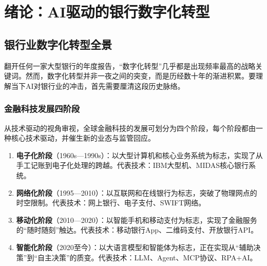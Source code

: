 
\chapter{绪论：AI驱动的银行数字化转型}



\section{银行业数字化转型全景}

翻开任何一家大型银行的年度报告，``数字化转型''几乎都是出现频率最高的战略关键词。然而，数字化转型并非一夜之间的突变，而是历经数十年的渐进积累。要理解当下AI对银行业的冲击，首先需要厘清这段历史脉络。

\subsection{金融科技发展四阶段}

从技术驱动的视角审视，全球金融科技的发展可划分为四个阶段，每个阶段都由一种核心技术驱动，并催生新的业态与监管回应。

\begin{theorybox}[金融科技四阶段模型]
\begin{enumerate}[leftmargin=1.5em]
  \item \textbf{电子化阶段}（1960s—1990s）：以大型计算机和核心业务系统为标志，实现了从手工记账到电子化处理的跨越。代表技术：IBM大型机、MIDAS核心银行系统。
  \item \textbf{网络化阶段}（1995—2010）：以互联网和在线银行为标志，突破了物理网点的时空限制。代表技术：网上银行、电子支付、SWIFT网络。
  \item \textbf{移动化阶段}（2010—2020）：以智能手机和移动支付为标志，实现了金融服务的``随时随刻''触达。代表技术：移动银行App、二维码支付、开放银行API。
  \item \textbf{智能化阶段}（2020至今）：以大语言模型和智能体为标志，正在实现从``辅助决策''到``自主决策''的质变。代表技术：LLM、Agent、MCP协议、RPA+AI。
\end{enumerate}
\end{theorybox}

